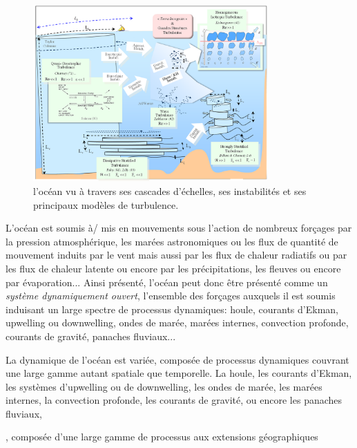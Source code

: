 \begin{figure}[!h]
  \centering
  \includegraphics[width=0.8\textwidth]{./INTRO/Ocean_scales.png}
  \caption{\color{red}l'océan vu à travers ses cascades d'échelles, ses instabilités et ses principaux modèles de turbulence.\color{black}}
  \label{fig_ocean_scales}
\end{figure}
L'océan est soumis à/ mis en mouvements sous l'action de nombreux forçages par la pression atmosphérique, les marées astronomiques ou les flux de quantité de mouvement induits par le vent mais aussi par les flux de chaleur radiatifs ou par les flux de chaleur latente ou encore par les précipitations, les fleuves ou encore par évaporation... Ainsi présenté, l'océan peut donc être présenté comme un \textit{système dynamiquement ouvert}, l'ensemble des forçages auxquels il est soumis induisant un large spectre de processus dynamiques: houle, courants d'Ekman, upwelling ou downwelling, ondes de marée, marées internes, convection profonde, courants de gravité, panaches fluviaux... 


La dynamique de l'océan est variée, composée de processus dynamiques couvrant une large gamme autant spatiale que temporelle. La houle, les courants d'Ekman, les systèmes d'upwelling ou de downwelling, les ondes de marée, les marées internes, la convection profonde, les courants de gravité, ou encore les panaches fluviaux, 

, composée d'une large gamme de processus aux extensions géographiques 


